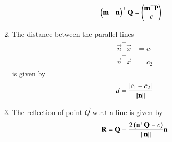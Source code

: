 \begin{enumerate}[label=\thesubsection.\arabic*.,ref=\thesubsection.\theenumi]
\begin{align}
	\label{eq:11/10/3/4/foot_of_perpendicular}
	\begin{pmatrix}\mathbf{m} & \mathbf{n}\end{pmatrix}^\top\mathbf{Q} &= 
	   \begin{pmatrix}
              \mathbf{m}^\top\mathbf{P}\\
	      c
	      \end{pmatrix}
\end{align}
\item The distance between the parallel lines 
\begin{align}
	\label{eq:parallel_lines}
	\begin{split}
		\vec{n}^{\top}\vec{x} &= c_1
		\\
		\vec{n}^{\top}\vec{x} &= c_2
	\end{split}
\end{align}
is given by 
\begin{align}
	\label{eq:dist_lines_2d}
	d = \frac{\left\vert   c_1-c_2 \right\vert}{\left\lVert\mathbf{n}\right\rVert}	
\end{align}
	\item 
The reflection of point $\vec{Q}$ w.r.t a line is given by
\begin{align}
	\label{eq:11/10/4/22}
\mathbf{R} = \mathbf{Q} -\frac{2\left(\mathbf{n}^{\top}\mathbf{Q}-c\right)}{\left\lVert\mathbf{n}\right\rVert}\mathbf{n}
\end{align}
\end{enumerate}
